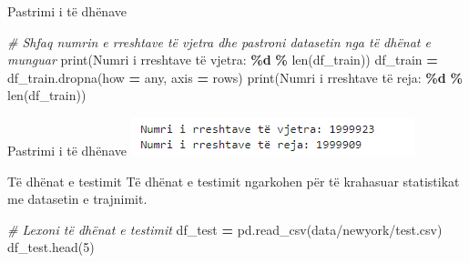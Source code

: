 \documentclass[
  ignorenonframetext,
]{beamer}
\newenvironment{Shaded}{\begin{snugshade}}{\end{snugshade}}
\newcommand{\BuiltInTok}[1]{#1}
\newcommand{\CommentTok}[1]{\textcolor[rgb]{0.56,0.35,0.01}{\textit{#1}}}
\newcommand{\DecValTok}[1]{\textcolor[rgb]{0.00,0.00,0.81}{#1}}
\newcommand{\NormalTok}[1]{#1}
\newcommand{\OperatorTok}[1]{\textcolor[rgb]{0.81,0.36,0.00}{\textbf{#1}}}
\newcommand{\SpecialCharTok}[1]{\textcolor[rgb]{0.81,0.36,0.00}{\textbf{#1}}}
\newcommand{\StringTok}[1]{\textcolor[rgb]{0.31,0.60,0.02}{#1}}
\begin{document}
\begin{frame}[fragile]{Pastrimi i të dhënave}
\protect\hypertarget{pastrimi-i-tuxeb-dhuxebnave-3}{}

\begin{Shaded}
\begin{Highlighting}[]
\CommentTok{\# Shfaq numrin e rreshtave të vjetra dhe pastroni datasetin nga të dhënat e munguar}
\BuiltInTok{print}\NormalTok{(}\StringTok{\textquotesingle{}Numri i rreshtave të vjetra: }\SpecialCharTok{\%d}\StringTok{\textquotesingle{}} \OperatorTok{\%} \BuiltInTok{len}\NormalTok{(df\_train))}
\NormalTok{df\_train }\OperatorTok{=}\NormalTok{ df\_train.dropna(how }\OperatorTok{=} \StringTok{\textquotesingle{}any\textquotesingle{}}\NormalTok{, axis }\OperatorTok{=} \StringTok{\textquotesingle{}rows\textquotesingle{}}\NormalTok{)}
\BuiltInTok{print}\NormalTok{(}\StringTok{\textquotesingle{}Numri i rreshtave të reja: }\SpecialCharTok{\%d}\StringTok{\textquotesingle{}} \OperatorTok{\%} \BuiltInTok{len}\NormalTok{(df\_train))}
\end{Highlighting}
\end{Shaded}
\end{frame}

\begin{frame}{Pastrimi i të dhënave}
\protect\hypertarget{pastrimi-i-tuxeb-dhuxebnave-4}{}
\includegraphics{./Figs/train6.png}
\end{frame}

\begin{frame}[fragile]{Të dhënat e testimit}
\protect\hypertarget{tuxeb-dhuxebnat-e-testimit}{}
Të dhënat e testimit ngarkohen për të krahasuar statistikat me datasetin
e trajnimit.


\begin{Shaded}
\begin{Highlighting}[]
\CommentTok{\# Lexoni të dhënat e testimit}
\NormalTok{df\_test }\OperatorTok{=}\NormalTok{ pd.read\_csv(}\StringTok{\textquotesingle{}data/newyork/test.csv\textquotesingle{}}\NormalTok{)}
\NormalTok{df\_test.head(}\DecValTok{5}\NormalTok{)}
\end{Highlighting}
\end{Shaded}
\end{frame}
\end{document}
